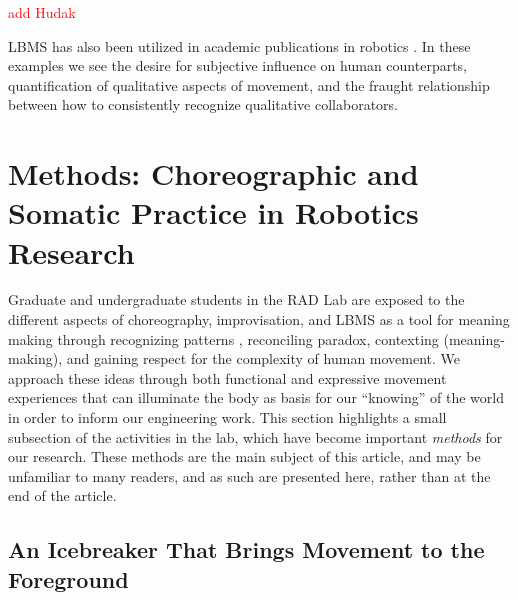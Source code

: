 \documentclass[arts,article,submit,moreauthors,pdftex,10pt,a4paper]{mdpi}
\begin{document}
\textcolor{red}{add Hudak}

LBMS has also been utilized in academic publications in robotics \cite{patla1982aspects,rett2007human,rett2008laban,masuda2009emotion,lourens2010communicating,masuda2010motion,knight2014expressive,knight2015layering,barakova2015observation,knight2016laban}.  In these examples we see the desire for subjective influence on human counterparts, quantification of qualitative aspects of movement, and the fraught relationship between how to consistently recognize qualitative collaborators.

\section{Methods: Choreographic and Somatic Practice in Robotics Research}


%

Graduate and undergraduate students in the RAD Lab are exposed to the different aspects of choreography, improvisation, and LBMS as a tool for meaning making through recognizing patterns , reconciling paradox, contexting (meaning-making), and gaining respect for the complexity of human movement.  We approach these ideas through both functional and expressive movement experiences that can illuminate the body as basis for our ``knowing'' of the world in order to inform our engineering work.  This section highlights a small subsection of the activities in the lab, which have become important \textit{methods} for our research.  These methods are the main subject of this article, and may be unfamiliar to many readers, and as such are presented here, rather than at the end of the article.

\subsection{An Icebreaker That Brings Movement to the Foreground}
\end{document}
